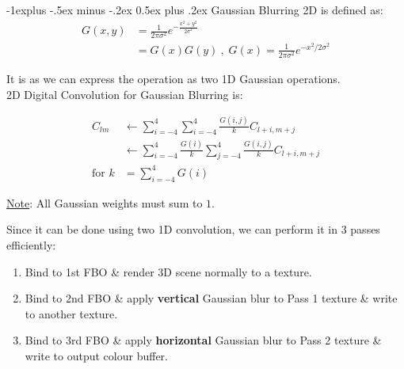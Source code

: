 \documentclass[10pt,landscape,letterpaper]{article}
\makeatletter
\renewcommand{\section}{\@startsection{section}{1}{0mm}%
                                {-1ex plus -.5ex minus -.2ex}%
                                {0.5ex plus .2ex}%
                                {\sffamily\large}}
\renewcommand{\subsection}{\@startsection{subsection}{2}{0mm}%
                                {-1explus -.5ex minus -.2ex}%
                                {0.5ex plus .2ex}%
                                {\sffamily\normalsize\itshape}}
\makeatother
\begin{document}
\begin{multicols}{3}
\subsection{Gaussian Blurring}
2D  is defined as:
\[
\begin{aligned}
G(x, y) &= \frac{1}{2\pi\sigma^2} e^{-\frac{x^2+y^2}{2\sigma^2}}
\\
&= G(x)G(y) \ , \; G(x) = \frac{1}{2\pi\sigma^2} e^{-x^2/2\sigma^2}
\end{aligned}
\]

It is  as we can express the operation as two 1D Gaussian operations.
\\
2D Digital Convolution for Gaussian Blurring is:

\[
\begin{aligned}
C_{lm} 
& \leftarrow \sum_{i=-4}^{4} \sum_{i=-4}^{4} \frac{G(i,j)}{k} C_{l+i, m+j}
\\
& \leftarrow \sum_{i=-4}^{4} \frac{G(i)}{k} \sum_{j=-4}^{4} \frac{G(i,j)}{k} C_{l+i, m+j}
\\
\text{for } k &= \sum_{i=-4}^4 G(i)
\end{aligned}
\]

\underline{Note}: All Gaussian weights must sum to $1$.

Since it can be done using two 1D convolution, we can perform it in 3 passes efficiently:
\begin{enumerate}
    \item Bind to 1st FBO \& render 3D scene normally to a texture.
    \item Bind to 2nd FBO \& apply \textbf{vertical} Gaussian blur to Pass 1 texture \& write to another texture.
    \item Bind to 3rd FBO \& apply \textbf{horizontal} Gaussian blur to Pass 2 texture \& write to output colour buffer.
\end{enumerate}
















\end{multicols}
\end{document}
